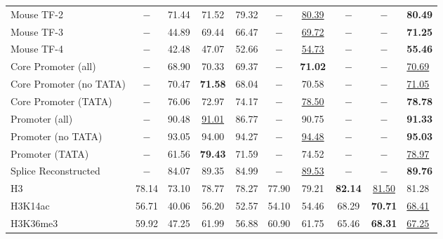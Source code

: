 \begin{table*}[t]
{\begin{tabular}{l|ccccccccb}
Mouse TF-2                 & $-$      & 71.44   & 71.52          & 79.32      & $-$         & \ul{80.39}     & $-$            & $-$            & \textbf{80.49}     \\
Mouse TF-3                 & $-$      & 44.89   & 69.44          & 66.47      & $-$         & \ul{69.72}     & $-$            & $-$            & \textbf{71.25}     \\
Mouse TF-4                 & $-$      & 42.48   & 47.07          & 52.66      & $-$         & \ul{54.73}     & $-$            & $-$            & \textbf{55.46}     \\ \hline
Core Promoter (all)        & $-$      & 68.90   & 70.33          & 69.37      & $-$         & \textbf{71.02} & $-$            & $-$            & \ul{70.69}         \\
Core Promoter (no TATA)    & $-$      & 70.47   & \textbf{71.58} & 68.04      & $-$         & 70.58          & $-$            & $-$            & \ul{71.05}         \\
Core Promoter (TATA)       & $-$      & 76.06   & 72.97          & 74.17      & $-$         & \ul{78.50}     & $-$            & $-$            & \textbf{78.78}     \\ \hline
Promoter (all)             & $-$      & 90.48   & \ul{91.01}     & 86.77      & $-$         & 90.75          & $-$            & $-$            & \textbf{91.33}     \\
Promoter (no TATA)         & $-$      & 93.05   & 94.00          & 94.27      & $-$         & \ul{94.48}     & $-$            & $-$            & \textbf{95.03}     \\
Promoter (TATA)            & $-$      & 61.56   & \textbf{79.43} & 71.59      & $-$         & 74.52          & $-$            & $-$            & \ul{78.97}         \\ \hline
Splice Reconstructed       & $-$      & 84.07   & 89.35          & 84.99      & $-$         & \ul{89.53}     & $-$            & $-$            & \textbf{89.76}     \\ \hline
H3                         & 78.14    & 73.10   & 78.77          & 78.27      & 77.90       & 79.21          & \textbf{82.14} & \ul{81.50}     & 81.28              \\
H3K14ac                    & 56.71    & 40.06   & 56.20          & 52.57      & 54.10       & 54.46          & 68.29          & \textbf{70.71} & \ul{68.41}         \\
H3K36me3                   & 59.92    & 47.25   & 61.99          & 56.88      & 60.90       & 61.75          & 65.46          & \textbf{68.31} & \ul{67.25}         \\

\end{tabular}}
\end{table*}
